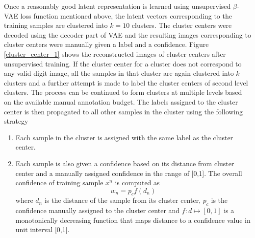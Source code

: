 \documentclass[runningheads]{llncs}
\begin{document}
Once a reasonably good latent representation is learned using unsupervised $\beta$-VAE loss function mentioned above, the latent vectors corresponding to the training samples are clustered into $k=10$ clusters.
The cluster centers were decoded using the decoder part of VAE and the resulting images corresponding to cluster centers were manually given a label and a confidence.
Figure \ref{cluster_center_1} shows the reconstructed images of cluster centers after unsupervised training.
If the cluster center for a cluster does not correspond to any valid digit image, all the samples in that cluster are again clustered into $k$ clusters and a further attempt is made to label the cluster centers of second level clusters.
The process can be continued to form clusters at multiple levels based on the available manual annotation budget.
The labels assigned to the cluster center is then propagated to all other samples in the cluster using the following strategy
\begin{enumerate}
    \item Each sample in the cluster is assigned with the  same label as the cluster center.
    \item Each sample is also given a confidence based on its distance from cluster center and  a manually assigned confidence in the range of [0,1]. The overall confidence of  training sample $x^n$ is computed as
\begin{equation}
w_n = p_cf(d_n)
\end{equation}
where $d_n$ is the distance of the sample from its cluster center, $p_c$  is the confidence manually assigned to the cluster center and $f: d \mapsto [0,1]$ is a monotonically decreasing function that maps distance to a confidence value in unit interval [0,1].
\end{enumerate}
\end{document}
